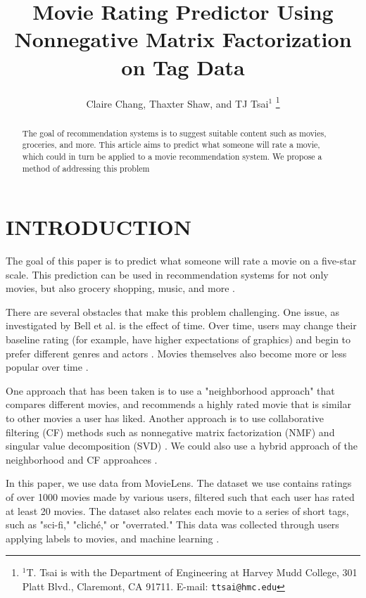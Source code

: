 \documentclass[letterpaper, 10 pt, conference]{ieeeconf}  %
\title{\LARGE \bf
Movie Rating Predictor Using Nonnegative Matrix Factorization on Tag Data
}
\author{Claire Chang, Thaxter Shaw, and TJ Tsai$^{1}$%
\thanks{$^{1}$T. Tsai is with the Department of Engineering at Harvey Mudd College,
301 Platt Blvd., Claremont, CA 91711. E-mail: {\tt\small ttsai@hmc.edu}}%
}
\begin{document}
\maketitle
\thispagestyle{empty}
\pagestyle{empty}


\begin{abstract}

The goal of recommendation systems is to suggest suitable content such as movies, groceries, and more. This article aims to predict what someone will rate a movie, which could in turn be applied to a movie recommendation system. We propose a method of addressing this problem 

\end{abstract}


\section{INTRODUCTION}

The goal of this paper is to predict what someone will rate a movie on a five-star scale.
This prediction can be used in recommendation systems for not only movies, but also grocery shopping, music, and more \cite{recsys}.

There are several obstacles that make this problem challenging. 
One issue, as investigated by Bell et al. is the effect of time. Over time, users may change their baseline rating (for example, have higher expectations of graphics) and begin to prefer different genres and actors \cite{netflix}.
Movies themselves also become more or less popular over time \cite{netflix}.

One approach that has been taken is to use a "neighborhood approach" that compares different movies, and recommends a highly rated movie that is similar to other movies a user has liked. 
Another approach is to use collaborative filtering (CF) methods such as nonnegative matrix factorization (NMF) and singular value decomposition (SVD) \cite{cf}. 
We could also use a hybrid approach of the neighborhood and CF approahces \cite{hybrid}.

In this paper, we use data from MovieLens. The dataset we use contains ratings of over 1000 movies made by various users, filtered such that each user has rated at least 20 movies.
The dataset also relates each movie to a series of short tags, such as "sci-fi," "cliché," or "overrated." This data was collected through users applying labels to movies, and machine learning \cite{lenskit}.
\end{document}
